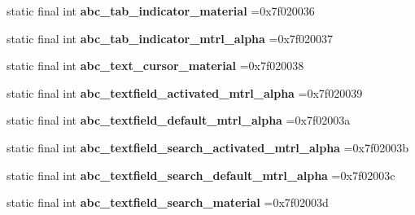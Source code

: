 \begin{DoxyCompactItemize}
\item 
\hypertarget{classcheck_1_1test_1_1_r_1_1drawable_a4dd08cc597941cf1632d202a2fbfd53e}{}static final int {\bfseries abc\+\_\+tab\+\_\+indicator\+\_\+material} =0x7f020036\label{classcheck_1_1test_1_1_r_1_1drawable_a4dd08cc597941cf1632d202a2fbfd53e}

\item 
\hypertarget{classcheck_1_1test_1_1_r_1_1drawable_aae3b6993bb2c5e813a0c0004dd55ac33}{}static final int {\bfseries abc\+\_\+tab\+\_\+indicator\+\_\+mtrl\+\_\+alpha} =0x7f020037\label{classcheck_1_1test_1_1_r_1_1drawable_aae3b6993bb2c5e813a0c0004dd55ac33}

\item 
\hypertarget{classcheck_1_1test_1_1_r_1_1drawable_a144384bb73bc5e7e63e6d8a5683d8cbe}{}static final int {\bfseries abc\+\_\+text\+\_\+cursor\+\_\+material} =0x7f020038\label{classcheck_1_1test_1_1_r_1_1drawable_a144384bb73bc5e7e63e6d8a5683d8cbe}

\item 
\hypertarget{classcheck_1_1test_1_1_r_1_1drawable_a4e968c3fc6a1087d66cf32b4eeb252c4}{}static final int {\bfseries abc\+\_\+textfield\+\_\+activated\+\_\+mtrl\+\_\+alpha} =0x7f020039\label{classcheck_1_1test_1_1_r_1_1drawable_a4e968c3fc6a1087d66cf32b4eeb252c4}

\item 
\hypertarget{classcheck_1_1test_1_1_r_1_1drawable_ac0768f602eda01acf383f9d8544dff98}{}static final int {\bfseries abc\+\_\+textfield\+\_\+default\+\_\+mtrl\+\_\+alpha} =0x7f02003a\label{classcheck_1_1test_1_1_r_1_1drawable_ac0768f602eda01acf383f9d8544dff98}

\item 
\hypertarget{classcheck_1_1test_1_1_r_1_1drawable_a1923a1cb3d9c03df7d17af02125c53bc}{}static final int {\bfseries abc\+\_\+textfield\+\_\+search\+\_\+activated\+\_\+mtrl\+\_\+alpha} =0x7f02003b\label{classcheck_1_1test_1_1_r_1_1drawable_a1923a1cb3d9c03df7d17af02125c53bc}

\item 
\hypertarget{classcheck_1_1test_1_1_r_1_1drawable_af17f4fed4ae9e6b4454a677b6118417b}{}static final int {\bfseries abc\+\_\+textfield\+\_\+search\+\_\+default\+\_\+mtrl\+\_\+alpha} =0x7f02003c\label{classcheck_1_1test_1_1_r_1_1drawable_af17f4fed4ae9e6b4454a677b6118417b}

\item 
\hypertarget{classcheck_1_1test_1_1_r_1_1drawable_ab58a786074c3b17b86ad4e616f17a2bb}{}static final int {\bfseries abc\+\_\+textfield\+\_\+search\+\_\+material} =0x7f02003d\label{classcheck_1_1test_1_1_r_1_1drawable_ab58a786074c3b17b86ad4e616f17a2bb}


\end{DoxyCompactItemize}
